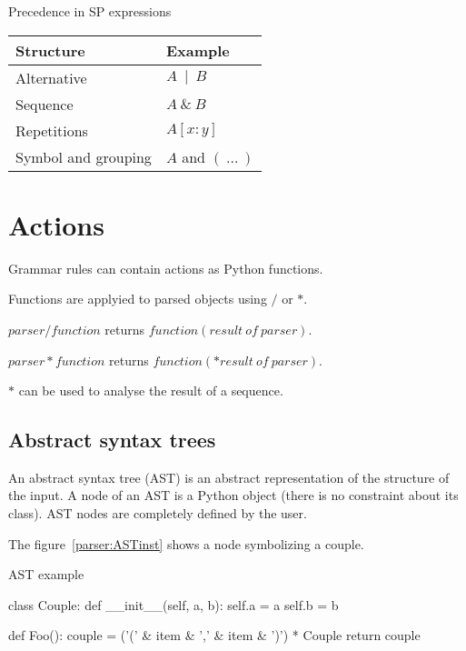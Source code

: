 \begin{tableau}
\caption{Precedence in SP expressions}                         \label{parser:precedence}
\begin{tabular}{| l | l |}
\hline
    Structure           & Example \\
\hline
\hline
    Alternative         & $A~\mid~B$ \\
\hline
    Sequence            & $A~\&~B$ \\
\hline
    Repetitions         & $A[x:y]$ \\
\hline
    Symbol and grouping & $A$ and $(~\ldots~)$ \\
\hline
\end{tabular}
\end{tableau}

\section{Actions}

Grammar rules can contain actions as Python functions.

Functions are applyied to parsed objects using $/$ or $*$.

$parser / function$ returns $function(result~of~parser)$.

$parser * function$ returns $function(*result~of~parser)$.

$*$ can be used to analyse the result of a sequence.

\subsection{Abstract syntax trees}                              \label{parser:AST}

An abstract syntax tree (AST) is an abstract representation of the structure of the input.
A node of an AST is a Python object (there is no constraint about its class).
AST nodes are completely defined by the user.

The figure~\ref{parser:ASTinst} shows a node symbolizing a couple.

\begin{code}
\caption{AST example}                                           \label{parser:ASTinst}
\begin{verbatimtab}[4]

class Couple:
    def __init__(self, a, b):
        self.a = a
        self.b = b

def Foo():
    couple = ('(' & item & ',' & item & ')') * Couple
    return couple
\end{verbatimtab}
\end{code}

